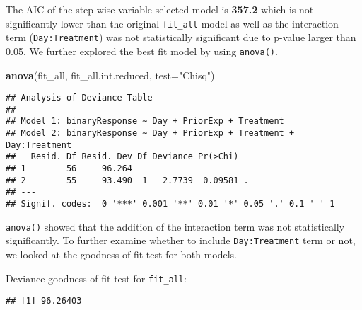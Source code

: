 \documentclass[
]{article}
\newenvironment{Shaded}{\begin{snugshade}}{\end{snugshade}}
\newcommand{\AttributeTok}[1]{\textcolor[rgb]{0.13,0.29,0.53}{#1}}
\newcommand{\CommentTok}[1]{\textcolor[rgb]{0.56,0.35,0.01}{\textit{#1}}}
\newcommand{\FunctionTok}[1]{\textcolor[rgb]{0.13,0.29,0.53}{\textbf{#1}}}
\newcommand{\NormalTok}[1]{#1}
\newcommand{\OtherTok}[1]{\textcolor[rgb]{0.56,0.35,0.01}{#1}}
\newcommand{\SpecialCharTok}[1]{\textcolor[rgb]{0.81,0.36,0.00}{\textbf{#1}}}
\newcommand{\StringTok}[1]{\textcolor[rgb]{0.31,0.60,0.02}{#1}}
\begin{document}
The AIC of the step-wise variable selected model is \textbf{357.2} which
is not significantly lower than the original \texttt{fit\_all} model as
well as the interaction term (\texttt{Day:Treatment}) was not
statistically significant due to p-value larger than 0.05. We further
explored the best fit model by using \texttt{anova()}.

\begin{Shaded}
\begin{Highlighting}[]
\FunctionTok{anova}\NormalTok{(fit\_all, fit\_all.int.reduced, }\AttributeTok{test=}\StringTok{"Chisq"}\NormalTok{)}
\end{Highlighting}
\end{Shaded}

\begin{verbatim}
## Analysis of Deviance Table
## 
## Model 1: binaryResponse ~ Day + PriorExp + Treatment
## Model 2: binaryResponse ~ Day + PriorExp + Treatment + Day:Treatment
##   Resid. Df Resid. Dev Df Deviance Pr(>Chi)  
## 1        56     96.264                       
## 2        55     93.490  1   2.7739  0.09581 .
## ---
## Signif. codes:  0 '***' 0.001 '**' 0.01 '*' 0.05 '.' 0.1 ' ' 1
\end{verbatim}

\texttt{anova()} showed that the addition of the interaction term was
not statistically significantly. To further examine whether to include
\texttt{Day:Treatment} term or not, we looked at the goodness-of-fit
test for both models.

Deviance goodness-of-fit test for \texttt{fit\_all}:

\begin{Shaded}
\end{Shaded}

\begin{verbatim}
## [1] 96.26403
\end{verbatim}

\begin{Shaded}
\end{Shaded}
\end{document}
